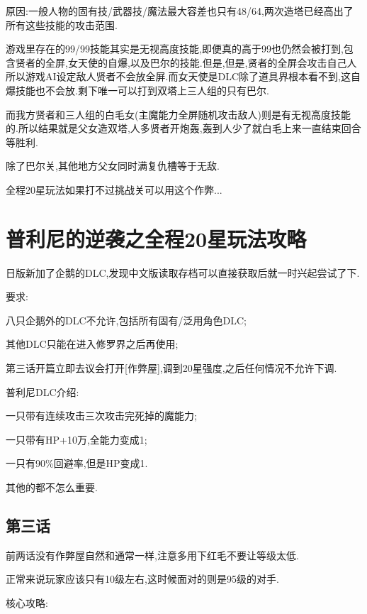 \begin{enumerate}
		原因:一般人物的固有技/武器技/魔法最大容差也只有48/64,两次造塔已经高出了所有这些技能的攻击范围.

		游戏里存在的99/99技能其实是无视高度技能,即便真的高于99也仍然会被打到,包含贤者的全屏,女天使的自爆,以及巴尔的技能.但是,但是,贤者的全屏会攻击自己人所以游戏AI设定敌人贤者不会放全屏.而女天使是DLC除了道具界根本看不到,这自爆技能也不会放.剩下唯一可以打到双塔上三人组的只有巴尔.

		而我方贤者和三人组的白毛女(主魔能力全屏随机攻击敌人)则是有无视高度技能的.所以结果就是父女造双塔,人多贤者开炮轰,轰到人少了就白毛上来一直结束回合等胜利.

		除了巴尔关,其他地方父女同时满复仇槽等于无敌.

		全程20星玩法如果打不过挑战关可以用这个作弊...

	\end{enumerate}
	
	\newpage

	\section{普利尼的逆袭之全程20星玩法攻略}

	日版新加了企鹅的DLC,发现中文版读取存档可以直接获取后就一时兴起尝试了下.

	要求:

	八只企鹅外的DLC不允许,包括所有固有/泛用角色DLC;

	其他DLC只能在进入修罗界之后再使用;

	第三话开篇立即去议会打开[作弊屋],调到20星强度,之后任何情况不允许下调.

	普利尼DLC介绍:

	一只带有连续攻击三次攻击完死掉的魔能力;

	一只带有HP+10万,全能力变成1;

	一只有90\%回避率,但是HP变成1.

	其他的都不怎么重要.

	\newpage

	\subsection{第三话}

	前两话没有作弊屋自然和通常一样,注意多用下红毛不要让等级太低.

	正常来说玩家应该只有10级左右,这时候面对的则是95级的对手.

	核心攻略:

